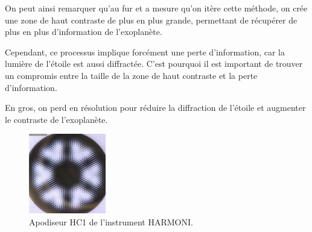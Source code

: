 On peut ainsi remarquer qu'au fur et a mesure qu'on itère cette méthode, on crée une zone de haut contraste de plus en plus grande, permettant de récupérer de plus en plus d'information de l'exoplanète.

Cependant, ce processus implique forcément une perte d'information, car la lumière de l'étoile est aussi diffractée. C'est pourquoi il est important de trouver un compromis entre la taille de la zone de haut contraste et la perte d'information.

En gros, on perd en résolution pour réduire la diffraction de l'étoile et augmenter le contraste de l'exoplanète.





\begin{figure}[htbp]
    \centering
    \includegraphics[width=0.3\textwidth]{figures/apod_harmoni.png}
    \caption{Apodiseur HC1 de l'instrument HARMONI.}%
\end{figure}

